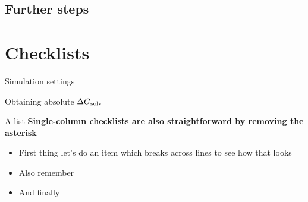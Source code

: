 \documentclass[9pt,tutorial]{livecoms}
\begin{document}
\subsection{Further steps}
%

\section{Checklists}

\begin{Checklists}

\begin{checklist}{Simulation settings}
\end{checklist}

\begin{checklist}{Obtaining absolute $\Delta G_\textup{solv}$ }
\end{checklist}

\begin{checklist}{A list}
\textbf{Single-column checklists are also straightforward by removing the asterisk}
\begin{itemize}
\item First thing let's do an item which breaks across lines to see how that looks
\item Also remember
\item And finally
\end{itemize}
\end{checklist}
%

\end{Checklists}
\end{document}
